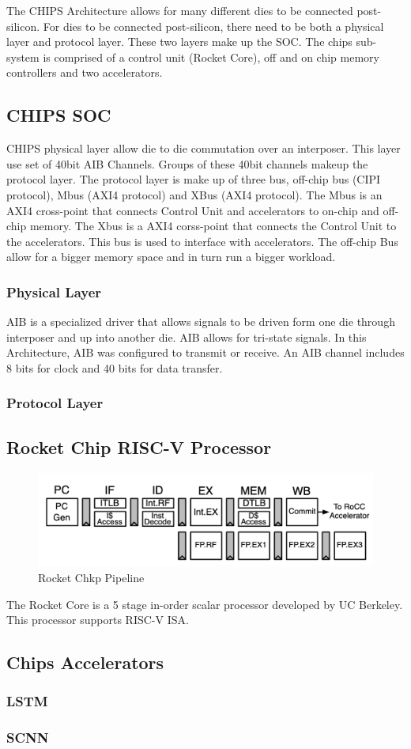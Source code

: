\documentclass[../main.tex]{subfiles}
\begin{document}
The CHIPS Architecture allows for many different dies to be connected post-silicon. For dies to be connected post-silicon, there need to be both a physical layer and protocol layer. These two layers make up the SOC. The chips sub-system is comprised of a control unit (Rocket Core), off and on chip memory controllers and two accelerators.
\subsection{CHIPS SOC}
CHIPS physical layer allow die to die commutation over an interposer. This layer use set of 40bit AIB Channels. Groups of these 40bit channels makeup the protocol layer. The protocol layer is make up of three bus, off-chip bus (CIPI protocol), Mbus (AXI4 protocol) and XBus (AXI4 protocol). The Mbus is an AXI4 cross-point that connects Control Unit and accelerators to on-chip and off-chip memory. The Xbus is a AXI4 corss-point that connects the Control Unit to the accelerators. This bus is used to interface with accelerators. The off-chip Bus allow for a bigger memory space and in turn run a bigger workload.
\subsubsection{Physical Layer}
AIB is a specialized driver that allows signals to be driven form one die through interposer and up into another die. AIB allows for tri-state signals. In this Architecture, AIB was configured to transmit or receive. An AIB channel includes 8 bits for clock and 40 bits for data transfer. 
\subsubsection{Protocol Layer}

\subsection{Rocket Chip RISC-V Processor}
\begin{figure}[H]
    \centering
    \includegraphics[scale=.4]{pngs/RocketPipeline.png}
    \caption{Rocket Chkp Pipeline\cite{Asanović:EECS-2016-17}}
    \label{fig:RocketChipPipeline}
\end{figure}
The Rocket Core is a 5 stage in-order scalar processor developed by UC Berkeley. This processor supports RISC-V ISA.
\subsection{Chips Accelerators}
\subsubsection{LSTM}
\blindtext
\subsubsection{SCNN}
\blindtext
\end{document}
